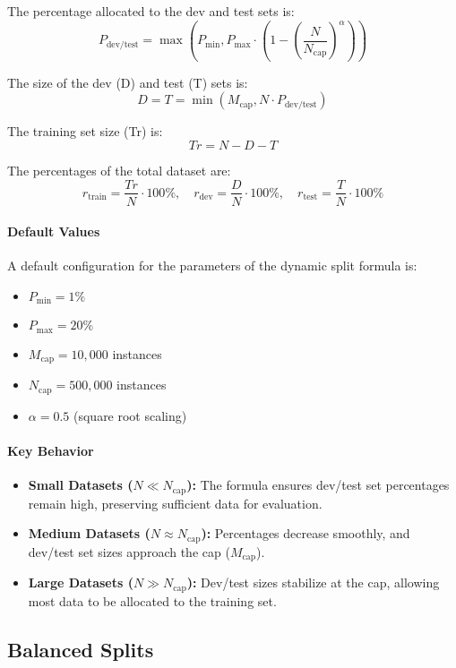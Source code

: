 \documentclass[12pt,openany]{book}
\begin{document}
\vspace{2em}

The percentage allocated to the dev and test sets is:
\[
P_{\text{dev/test}} = \max\left(P_{\text{min}}, P_{\text{max}} \cdot \left(1 - \left(\frac{N}{N_{\text{cap}}}\right)^\alpha\right)\right)
\]

The size of the dev (D) and test (T) sets is:
\[
D = T = \min(M_{\text{cap}}, N \cdot P_{\text{dev/test}})
\]

The training set size (Tr) is:
\[
Tr = N - D - T
\]

The percentages of the total dataset are:
\[
r_{\text{train}} = \frac{Tr}{N} \cdot 100\%, \quad r_{\text{dev}} = \frac{D}{N} \cdot 100\%, \quad r_{\text{test}} = \frac{T}{N} \cdot 100\%
\]

\paragraph{Default Values}
A default configuration for the parameters of the dynamic split formula is:
\begin{itemize}
    \item \(P_{\text{min}} = 1\%\)
    \item \(P_{\text{max}} = 20\%\)
    \item \(M_{\text{cap}} = 10,000\) instances
    \item \(N_{\text{cap}} = 500,000\) instances
    \item \(\alpha = 0.5\) (square root scaling)
\end{itemize}

\paragraph{Key Behavior}
\begin{itemize}
    \item \textbf{Small Datasets (\(N \ll N_{\text{cap}}\)):} The formula ensures dev/test set percentages remain high, preserving sufficient data for evaluation.
    \item \textbf{Medium Datasets (\(N \approx N_{\text{cap}}\)):} Percentages decrease smoothly, and dev/test set sizes approach the cap (\(M_{\text{cap}}\)).
    \item \textbf{Large Datasets (\(N \gg N_{\text{cap}}\)):} Dev/test sizes stabilize at the cap, allowing most data to be allocated to the training set.
\end{itemize}

\subsection{Balanced Splits}
\end{document}
